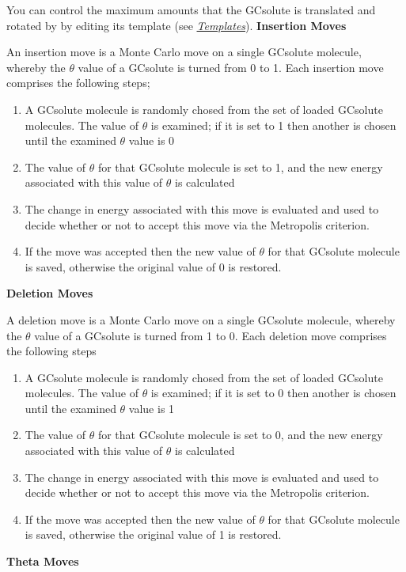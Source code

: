 \documentclass[letterpaper,10pt,english]{manual}
\begin{document}
You can control the maximum amounts that the GCsolute is translated and rotated by by editing its template (see \hyperlink{temref}{\emph{Templates}}).
\textbf{Insertion Moves}

An insertion move is a Monte Carlo move on a single GCsolute molecule, whereby the $\theta$ value of a GCsolute is turned from 0 to 1. Each insertion move comprises the following steps;
\begin{enumerate}
\item {} 
A GCsolute molecule is randomly chosed from the set of loaded GCsolute molecules. The value of $\theta$ is examined; if it is set to 1 then another is chosen until the examined $\theta$ value is 0

\item {} 
The value of $\theta$ for that GCsolute molecule is set to 1, and the new energy associated with this value of $\theta$ is calculated

\item {} 
The change in energy associated with this move is evaluated and used to decide whether or not to accept this move via the Metropolis criterion.

\item {} 
If the move was accepted then the new value of $\theta$ for that GCsolute molecule is saved, otherwise the original value of 0 is restored.

\end{enumerate}
\textbf{Deletion Moves}

A deletion move is a Monte Carlo move on a single GCsolute molecule, whereby the $\theta$ value of a GCsolute is turned from 1 to 0. Each deletion move comprises the following steps
\begin{enumerate}
\item {} 
A GCsolute molecule is randomly chosed from the set of loaded GCsolute molecules. The value of $\theta$ is examined; if it is set to 0 then another is chosen until the examined $\theta$ value is 1

\item {} 
The value of $\theta$ for that GCsolute molecule is set to 0, and the new energy associated with this value of $\theta$ is calculated

\item {} 
The change in energy associated with this move is evaluated and used to decide whether or not to accept this move via the Metropolis criterion.

\item {} 
If the move was accepted then the new value of $\theta$ for that GCsolute molecule is saved, otherwise the original value of 1 is restored.

\end{enumerate}
\textbf{Theta Moves}
\end{document}
